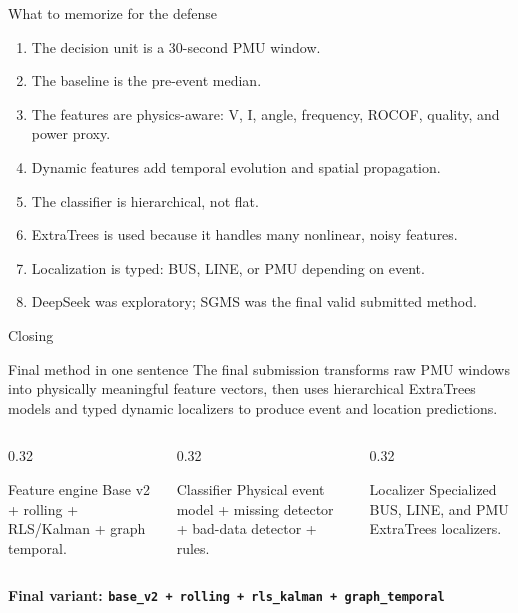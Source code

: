 \documentclass[10pt,aspectratio=169]{beamer}
\newcommand{\code}[1]{\texttt{\footnotesize #1}}
\begin{document}
\begin{frame}{What to memorize for the defense}
\small
\begin{enumerate}
  \item The decision unit is a 30-second PMU window.
  \item The baseline is the pre-event median.
  \item The features are physics-aware: V, I, angle, frequency, ROCOF, quality, and power proxy.
  \item Dynamic features add temporal evolution and spatial propagation.
  \item The classifier is hierarchical, not flat.
  \item ExtraTrees is used because it handles many nonlinear, noisy features.
  \item Localization is typed: BUS, LINE, or PMU depending on event.
  \item DeepSeek was exploratory; SGMS was the final valid submitted method.
\end{enumerate}
\end{frame}

\begin{frame}{Closing}
\small
\begin{block}{Final method in one sentence}
The final submission transforms raw PMU windows into physically meaningful feature vectors, then uses hierarchical ExtraTrees models and typed dynamic localizers to produce event and location predictions.
\end{block}
\begin{columns}[T,totalwidth=\textwidth]
\begin{column}{0.32\textwidth}
\begin{exampleblock}{Feature engine}
Base v2 + rolling + RLS/Kalman + graph temporal.
\end{exampleblock}
\end{column}
\begin{column}{0.32\textwidth}
\begin{exampleblock}{Classifier}
Physical event model + missing detector + bad-data detector + rules.
\end{exampleblock}
\end{column}
\begin{column}{0.32\textwidth}
\begin{exampleblock}{Localizer}
Specialized BUS, LINE, and PMU ExtraTrees localizers.
\end{exampleblock}
\end{column}
\end{columns}
\vspace{3mm}
\centering
{\Large\bfseries Final variant: \code{base\_v2 + rolling + rls\_kalman + graph\_temporal}}
\end{frame}
\end{document}
